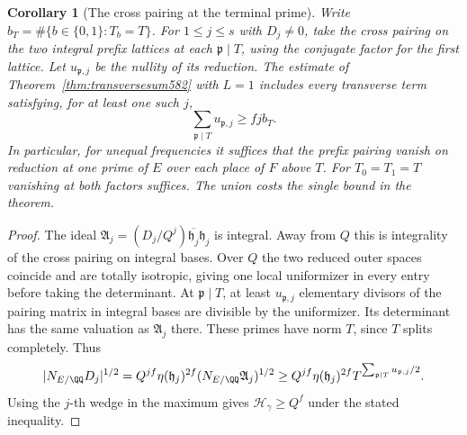 \documentclass[a4paper,11pt]{article}
\newtheorem{corollary}[proposition]{Corollary}
\theoremstyle{definition}
\theoremstyle{remark}
\numberwithin{equation}{section}
\begin{document}
\begin{corollary}[The cross pairing at the terminal prime]
\leavevmode\label{cor:terminalprefix582}
Write \(b_T=\#\{b\in\{0,1\}:T_b=T\}\). For \(1\le j\le s\)
with \(D_j\ne0\), take the cross pairing on the two integral
prefix lattices at each \(\mathfrak p\mid T\), using the conjugate
factor for the first lattice. Let \(u_{\mathfrak p,j}\) be the
nullity of its reduction. The estimate of
Theorem~\ref{thm:transversesum582} with \(L=1\) includes every
transverse term satisfying, for at least one such \(j\),
\[
             \sum_{\mathfrak p\mid T}u_{\mathfrak p,j}\ge fjb_T .
\]
In particular, for unequal frequencies it suffices that the
prefix pairing vanish on reduction at one prime of \(E\)
over each place of \(F\) above \(T\). For \(T_0=T_1=T\)
vanishing at both factors suffices. The union costs the single
bound in the theorem.
\end{corollary}
\begin{proof}
The ideal
\(\mathfrak A_j=(D_j/Q^j)\overline{\mathfrak h_j}\mathfrak h_j\)
is integral. Away from \(Q\) this is integrality of the cross
pairing on integral bases. Over \(Q\) the two reduced outer
spaces coincide and are totally isotropic, giving one local
uniformizer in every entry before taking the determinant.
At \(\mathfrak p\mid T\), at least \(u_{\mathfrak p,j}\)
elementary divisors of the pairing matrix in integral bases
are divisible by the uniformizer. Its determinant has the same
valuation as \(\mathfrak A_j\) there. These primes have norm
\(T\), since \(T\) splits completely. Thus
\[
  |N_{E/\QQ}D_j|^{1/2}
   =Q^{jf}\eta(\mathfrak h_j)^{2f}(N_{E/\QQ}\mathfrak A_j)^{1/2}
   \ge Q^{jf}\eta(\mathfrak h_j)^{2f}
                    T^{\sum_{\mathfrak p\mid T}u_{\mathfrak p,j}/2}.
\]
Using the \(j\)-th wedge in the maximum gives
\(\mathcal H_\gamma\ge Q^f\) under the stated inequality.
\end{proof}
\end{document}
